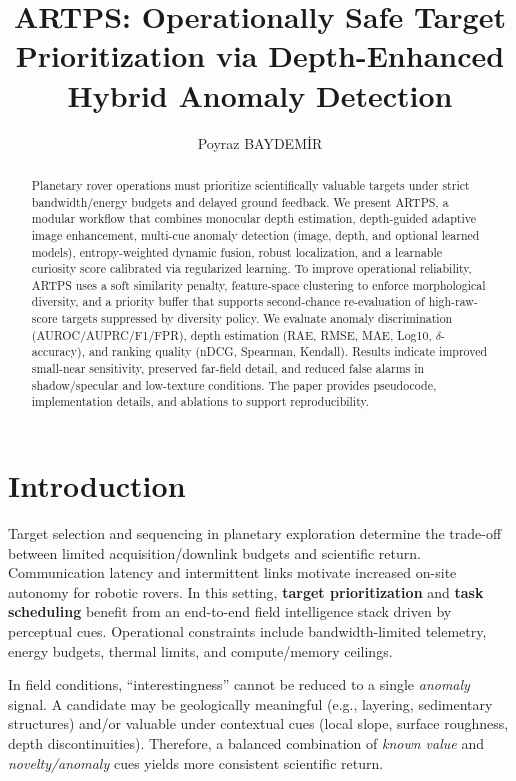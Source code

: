 \documentclass[12pt]{article}
\title{ARTPS: Operationally Safe Target Prioritization via Depth-Enhanced Hybrid Anomaly Detection}
\author{Poyraz BAYDEMİR}
\date{}
\begin{document}
\maketitle

\tableofcontents
\newpage

\begin{abstract}
Planetary rover operations must prioritize scientifically valuable targets under strict bandwidth/energy budgets and delayed ground feedback. We present ARTPS, a modular workflow that combines monocular depth estimation, depth-guided adaptive image enhancement, multi-cue anomaly detection (image, depth, and optional learned models), entropy-weighted dynamic fusion, robust localization, and a learnable curiosity score calibrated via regularized learning. To improve operational reliability, ARTPS uses a soft similarity penalty, feature-space clustering to enforce morphological diversity, and a priority buffer that supports second-chance re-evaluation of high-raw-score targets suppressed by diversity policy. We evaluate anomaly discrimination (AUROC/AUPRC/F1/FPR), depth estimation (RAE, RMSE, MAE, Log10, \(\delta\)-accuracy), and ranking quality (nDCG, Spearman, Kendall). Results indicate improved small-near sensitivity, preserved far-field detail, and reduced false alarms in shadow/specular and low-texture conditions. The paper provides pseudocode, implementation details, and ablations to support reproducibility.
\end{abstract}

\section{Introduction}
Target selection and sequencing in planetary exploration determine the trade-off between limited acquisition/downlink budgets and scientific return. Communication latency and intermittent links motivate increased on-site autonomy for robotic rovers. In this setting, \textbf{target prioritization} and \textbf{task scheduling} benefit from an end-to-end field intelligence stack driven by perceptual cues. Operational constraints include bandwidth-limited telemetry, energy budgets, thermal limits, and compute/memory ceilings.

In field conditions, “interestingness” cannot be reduced to a single \emph{anomaly} signal. A candidate may be geologically meaningful (e.g., layering, sedimentary structures) and/or valuable under contextual cues (local slope, surface roughness, depth discontinuities). Therefore, a balanced combination of \emph{known value} and \emph{novelty/anomaly} cues yields more consistent scientific return.
\end{document}
